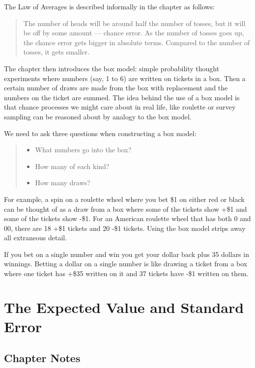 \documentclass[
]{book}
\providecommand{\tightlist}{%
  \setlength{\itemsep}{0pt}\setlength{\parskip}{0pt}}
\begin{document}
The Law of Averages is described informally in the chapter as follows:

\begin{quote}
The number of heads will be around half the number of tosses, but it will be off by some amount --- chance error. As the number of tosses goes up, the chance error gets bigger in absolute terms. Compared to the number of tosses, it gets smaller.
\end{quote}

The chapter then introduces the box model: simple probability thought experiments where numbers (say, 1 to 6) are written on tickets in a box. Then a certain number of draws are made from the box with replacement and the numbers on the ticket are summed. The idea behind the use of a box model is that chance processes we might care about in real life, like roulette or survey sampling can be reasoned about by analogy to the box model.

We need to ask three questions when constructing a box model:

\begin{quote}
\begin{itemize}
\tightlist
\item
  What numbers go into the box?
\item
  How many of each kind?
\item
  How many draws?
\end{itemize}
\end{quote}

For example, a spin on a roulette wheel where you bet \$1 on either red or black can be thought of as a draw from a box where some of the tickets show +\$1 and some of the tickets show -\$1. For an American roulette wheel that has both 0 and 00, there are 18 +\$1 tickets and 20 -\$1 tickets. Using the box model strips away all extraneous detail.

If you bet on a single number and win you get your dollar back plus 35 dollars in winnings. Betting a dollar on a single number is like drawing a ticket from a box where one ticket has +\$35 written on it and 37 tickets have -\$1 written on them.

\hypertarget{expected_value}{%
\chapter{The Expected Value and Standard Error}\label{expected_value}}

\hypertarget{chapter-notes-16}{%
\section{Chapter Notes}\label{chapter-notes-16}}
\end{document}
